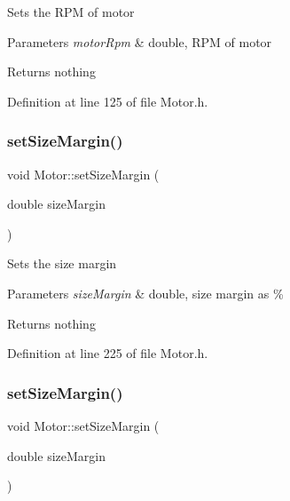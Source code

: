 Sets the R\+PM of motor


\begin{DoxyParams}{Parameters}
{\em motor\+Rpm} & double, R\+PM of motor\\
\hline
\end{DoxyParams}
\begin{DoxyReturn}{Returns}
nothing 
\end{DoxyReturn}


Definition at line 125 of file Motor.\+h.

\mbox{\label{class_motor_ab39a9375d17af151b6f9516674f37928}} 
\subsubsection{\texorpdfstring{set\+Size\+Margin()}{setSizeMargin()}\hspace{0.1cm}{\footnotesize\ttfamily [1/3]}}
{\footnotesize\ttfamily void Motor\+::set\+Size\+Margin (\begin{DoxyParamCaption}\item[{double}]{size\+Margin }\end{DoxyParamCaption})\hspace{0.3cm}{\ttfamily [inline]}}

Sets the size margin


\begin{DoxyParams}{Parameters}
{\em size\+Margin} & double, size margin as \%\\
\hline
\end{DoxyParams}
\begin{DoxyReturn}{Returns}
nothing 
\end{DoxyReturn}


Definition at line 225 of file Motor.\+h.

\mbox{\label{class_motor_ab39a9375d17af151b6f9516674f37928}} 
\subsubsection{\texorpdfstring{set\+Size\+Margin()}{setSizeMargin()}\hspace{0.1cm}{\footnotesize\ttfamily [2/3]}}
{\footnotesize\ttfamily void Motor\+::set\+Size\+Margin (\begin{DoxyParamCaption}\item[{double}]{size\+Margin }\end{DoxyParamCaption})\hspace{0.3cm}{\ttfamily [inline]}}

